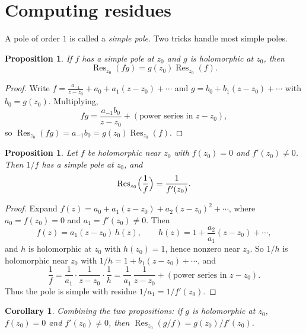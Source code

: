 \documentclass[11pt]{article}
\theoremstyle{plain}
\newtheorem{proposition}[theorem]{Proposition}
\newtheorem{corollary}[theorem]{Corollary}
\theoremstyle{definition}
\theoremstyle{boldremark}
\theoremstyle{remark}
\numberwithin{equation}{section}
\begin{document}
\section{Computing residues}
A pole of order $1$ is called a \emph{simple pole}. Two tricks handle most
simple poles.

\begin{proposition}\label{prop:res-product}
If $f$ has a simple pole at $z_0$ and $g$ is holomorphic at $z_0$, then
\[
 \operatorname{Res}_{z_0}(fg)=g(z_0)\operatorname{Res}_{z_0}(f).
\]
\end{proposition}
\begin{proof}
Write $f=\frac{a_{-1}}{z-z_0}+a_0+a_1(z-z_0)+\cdots$ and
$g=b_0+b_1(z-z_0)+\cdots$ with $b_0=g(z_0)$. Multiplying,
\[
 fg=\frac{a_{-1}b_0}{z-z_0}+(\text{power series in }z-z_0),
\]
so $\operatorname{Res}_{z_0}(fg)=a_{-1}b_0=g(z_0)\operatorname{Res}_{z_0}(f)$.
\end{proof}

\begin{proposition}\label{prop:res-simple-zero}
Let $f$ be holomorphic near $z_0$ with $f(z_0)=0$ and $f'(z_0)\ne0$. Then
$1/f$ has a simple pole at $z_0$, and
\[
 \operatorname{Res}_{z_0}\Bigl(\frac1f\Bigr)=\frac{1}{f'(z_0)}.
\]
\end{proposition}
\begin{proof}
Expand $f(z)=a_0+a_1(z-z_0)+a_2(z-z_0)^2+\cdots$, where $a_0=f(z_0)=0$ and
$a_1=f'(z_0)\ne0$. Then
\[
 f(z)=a_1(z-z_0)\,h(z),\qquad
 h(z)=1+\frac{a_2}{a_1}(z-z_0)+\cdots,
\]
and $h$ is holomorphic at $z_0$ with $h(z_0)=1$, hence nonzero near $z_0$.
So $1/h$ is holomorphic near $z_0$ with $1/h=1+b_1(z-z_0)+\cdots$, and
\[
 \frac1f=\frac{1}{a_1}\cdot\frac{1}{z-z_0}\cdot\frac1h
 =\frac{1}{a_1}\,\frac{1}{z-z_0}+(\text{power series in }z-z_0).
\]
Thus the pole is simple with residue $1/a_1=1/f'(z_0)$.
\end{proof}
\begin{corollary}
Combining the two propositions: if $g$ is holomorphic at $z_0$, $f(z_0)=0$
and $f'(z_0)\ne0$, then
$\operatorname{Res}_{z_0}(g/f)=g(z_0)/f'(z_0)$.
\end{corollary}
\end{document}

